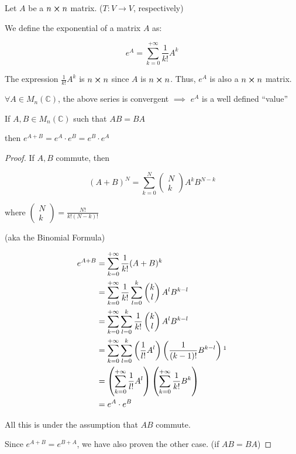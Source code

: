 \begin{definition}
	Let $A$ be a $n \cross n$ matrix. ($T: V \to V$, respectively)

	We define the exponential of a matrix $A$ as:

	\[e^A=\sum_{k=0}^{+\infty} \frac{1}{k!} A^k\]

	The expression $\frac{1}{k!} A^k$ is $n\cross n$ since $A$ is $n\cross n$. Thus, $e^A$ is also a $n\cross n$ matrix.
\end{definition}

\begin{theorem}
	$\forall A \in M_n(\mathbb{C})$, the above series is convergent $\implies$ $e^A$ is a well defined ``value''
\end{theorem}

\begin{theorem}
	If $A, B \in M_n(\mathbb{C})$ such that $AB = BA$

	then $e^{A+B} = e^A \cdot e^B = e^B \cdot e^A$
\end{theorem}

\begin{proof}
	If $A, B$ commute, then

	\[(A + B)^N = \sum_{k=0}^N \begin{pmatrix}
		N\\k
	\end{pmatrix} A^k B^{N-k}\]

	where $\begin{pmatrix}
			N\\k
	\end{pmatrix} = \frac{N!}{k! (N-k)!}$

	(aka the Binomial Formula)

	\begin{align}
		e^{A + B} &= \sum_{k=0}^{+\infty} \frac{1}{k!} (A + B)^k\\
		&= \sum_{k=0}^{+\infty} \frac{1}{k!} \sum_{l=0}^k \begin{pmatrix}
			k\\l
		\end{pmatrix} A^l B^{k-l}\\
		&= \sum_{k=0}^{+\infty} \sum_{l=0}^k \frac{1}{k!}  \begin{pmatrix}
			k\\l
		\end{pmatrix} A^l B^{k-l}\\
		&= \sum_{k=0}^{+\infty} \sum_{l=0}^k \left(\frac{1}{l!} A^l\right) \left(\frac{1}{(k-1)!} B^{k-l}\right)\footnotemark\\
		&= \left( \sum_{k=0}^{+\infty} \frac{1}{l!}A^l\right)\left(\sum_{k=0}^{+\infty} \frac{1}{k!} B^k\right)\\
		&= e^A \cdot e^B
	\end{align}


	All this is under the assumption that $AB$ commute.

	Since $e^{A+B} = e^{B + A}$, we have also proven the other case. (if $AB = BA$)
\end{proof}

